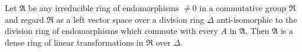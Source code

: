 Let $\mathfrak{A}$ be any irreducible ring of endomorphisms $\neq 0$ in a commutative group $\mathfrak{R}$ and regard $\mathfrak{R}$ as a left vector space over a division ring $\Delta$ anti-isomorphic to the division ring of endomorphisms which commute with every $A$ in $\mathfrak{A}$. Then $\mathfrak{A}$ is a dense ring of linear transformations in $\mathfrak{R}$ over $\Delta$.
